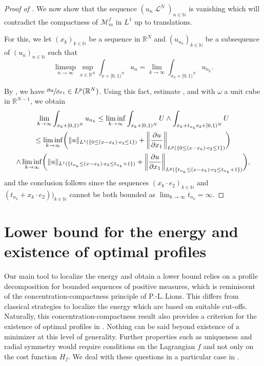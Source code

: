 \documentclass[JEP,XML,SOM,Unicode,published]{cedram}
\theoremstyle{plain}
\theoremstyle{definition}
\newcommand{\N}{\mathbb{N}}
\newcommand{\R}{\mathbb{R}}
\DeclarePairedDelimiter{\norm}{\lVert}{\rVert}
\DeclareMathOperator{\lbm}{\mathcal{L}}
\begin{document}
\begin{proof}[Proof of ]
We now show that the sequence \((u_n\lbm^N)_{n\in\N}\) is vanishing which will contradict the compactness of \(\mathcal{M}^f_m\) in \(L^1\) up to translations.

For this, we let \((x_k)_{k\in\N}\) be a sequence in \(\R^N\) and \((u_{n_k})_{k\in\N}\) be a subsequence of \((u_n)_{n\in\N}\) such that
\[
\limsup_{n\to\infty}\sup_{x\in\R^N}\int_{x+[0,1)^N}u_n=\lim_{k\to\infty}\int_{x_k+[0,1)^N}u_{n_k}.
\]

By , we have \(\sfrac{\partial u}{\partial x_1}\in L^p(\R^N)\). Using this fact, estimate , and  with $\omega$ a unit cube in $\R^{N-1}$, we obtain
\begin{multline*}
\lim_{k\to\infty}\int_{x_k+[0,1)^N}u_{n_k}\leq \liminf_{k\to\infty}\int_{x_k+[0,1)^N}U\wedge\int_{x_k+t_{n_k} e_2+[0,1)^N} U\\
\leq \liminf_{k\to\infty} \biggl(\norm{u}_{L^1(\{0\leq (x-x_k)\cdot e_2\leq 1\})}+
\norm*{\frac{\partial u}{\partial x_1}}_{L^p(\{0\leq (x-x_k)\cdot e_2\leq 1\})}\biggr)\\
\wedge\liminf_{k\to\infty} \biggl(
\norm{u}_{L^1(\{t_{n_k}\leq (x-x_k)\cdot e_2\leq t_{n_k}+1\})}+
\norm*{\frac{\partial u}{\partial x_1}}_{L^p(\{t_{n_k}\leq (x-x_k)\cdot e_2\leq t_{n_k}+1\})} \biggr),
\end{multline*}
and the conclusion follows since the sequences \((x_k\cdot e_2)_{k\in\N}\) and \((t_{n_k}+x_k\cdot e_2))_{k\in\N}\) cannot be both bounded as \(\lim_{k\to\infty}t_{n_k}=\infty\).
\end{proof}

\section{Lower bound for the energy and existence of optimal profiles}\label{sectionLowerBound}

Our main tool to localize the energy and obtain a lower bound relies on a profile decomposition for bounded sequences of positive measures, which is reminiscent of the concentration-compactness principle of P.-L.\,Lions. This differs from classical strategies to localize the energy which are based on suitable cut-offs. Naturally, this concentration-compactness result also provides a criterion for the existence of optimal profiles in . Nothing can be said beyond existence of a minimizer at this level of generality. Further properties such as uniqueness and radial symmetry would require conditions on the Lagrangian $f$ and not only on the cost function $H_f$. We deal with these questions in a particular case in .
\end{document}

